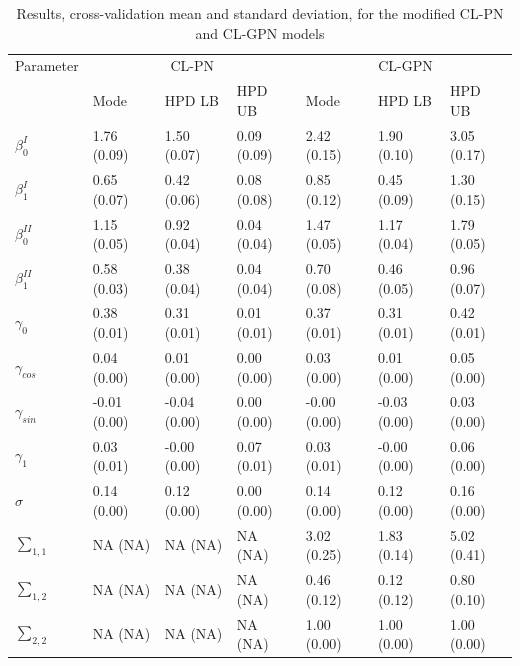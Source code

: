 \documentclass[12pt,]{article}
\begin{document}
\begin{table}

\caption{\label{tab:estCLGPN}Results, cross-validation mean and standard deviation, for the modified CL-PN and CL-GPN models}
\centering
\begin{tabular}[t]{lllllll}
\toprule
\multicolumn{1}{c}{Parameter} & \multicolumn{3}{c}{CL-PN} & \multicolumn{3}{c}{CL-GPN} \\
\cmidrule(l{2pt}r{2pt}){1-1} \cmidrule(l{2pt}r{2pt}){2-4} \cmidrule(l{2pt}r{2pt}){5-7}
  & Mode & HPD LB & HPD UB & Mode & HPD LB & HPD UB\\
\midrule
$\beta_0^{I}$ & 1.76 (0.09) & 1.50 (0.07) & 0.09 (0.09) & 2.42 (0.15) & 1.90 (0.10) & 3.05 (0.17)\\
$\beta_1^{I}$ & 0.65 (0.07) & 0.42 (0.06) & 0.08 (0.08) & 0.85 (0.12) & 0.45 (0.09) & 1.30 (0.15)\\
$\beta_0^{II}$ & 1.15 (0.05) & 0.92 (0.04) & 0.04 (0.04) & 1.47 (0.05) & 1.17 (0.04) & 1.79 (0.05)\\
$\beta_1^{II}$ & 0.58 (0.03) & 0.38 (0.04) & 0.04 (0.04) & 0.70 (0.08) & 0.46 (0.05) & 0.96 (0.07)\\
$\gamma_0$ & 0.38 (0.01) & 0.31 (0.01) & 0.01 (0.01) & 0.37 (0.01) & 0.31 (0.01) & 0.42 (0.01)\\
\addlinespace
$\gamma_{cos}$ & 0.04 (0.00) & 0.01 (0.00) & 0.00 (0.00) & 0.03 (0.00) & 0.01 (0.00) & 0.05 (0.00)\\
$\gamma_{sin}$ & -0.01 (0.00) & -0.04 (0.00) & 0.00 (0.00) & -0.00 (0.00) & -0.03 (0.00) & 0.03 (0.00)\\
$\gamma_1$ & 0.03 (0.01) & -0.00 (0.00) & 0.07 (0.01) & 0.03 (0.01) & -0.00 (0.00) & 0.06 (0.00)\\
$\sigma$ & 0.14 (0.00) & 0.12 (0.00) & 0.00 (0.00) & 0.14 (0.00) & 0.12 (0.00) & 0.16 (0.00)\\
$\sum_{1,1}$ & NA (NA) & NA (NA) & NA (NA) & 3.02 (0.25) & 1.83 (0.14) & 5.02 (0.41)\\
\addlinespace
$\sum_{1,2}$ & NA (NA) & NA (NA) & NA (NA) & 0.46 (0.12) & 0.12 (0.12) & 0.80 (0.10)\\
$\sum_{2,2}$ & NA (NA) & NA (NA) & NA (NA) & 1.00 (0.00) & 1.00 (0.00) & 1.00 (0.00)\\
\bottomrule
\end{tabular}
\end{table}
\end{document}
